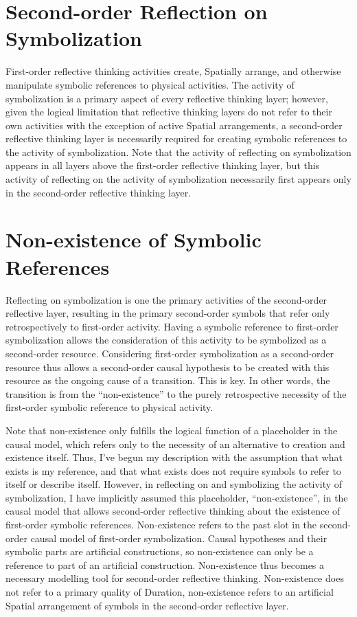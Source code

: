 \section{Second-order Reflection on Symbolization}

First-order reflective thinking activities create, Spatially arrange,
and otherwise manipulate symbolic references to physical activities.
The activity of symbolization is a primary aspect of every reflective
thinking layer; however, given the logical limitation that reflective
thinking layers do not refer to their own activities with the
exception of active Spatial arrangements, a second-order reflective
thinking layer is necessarily required for creating symbolic
references to the activity of symbolization.  Note that the activity
of reflecting on symbolization appears in all layers above the
first-order reflective thinking layer, but this activity of reflecting
on the activity of symbolization necessarily first appears only in the
second-order reflective thinking layer.

\section{Non-existence of Symbolic References}

Reflecting on symbolization is one the primary activities of the
second-order reflective layer, resulting in the primary second-order
symbols that refer only retrospectively to first-order activity.
Having a symbolic reference to first-order symbolization allows the
consideration of this activity to be symbolized as a second-order
resource.  Considering first-order symbolization as a second-order
resource thus allows a second-order causal hypothesis to be created
with this resource as the ongoing cause of a transition.  This is key.
In other words, the transition is from the ``non-existence'' to the
purely retrospective necessity of the first-order symbolic reference
to physical activity.

Note that non-existence only fulfills the logical function of a
placeholder in the causal model, which refers only to the necessity of
an alternative to creation and existence itself.  Thus, I've begun my
description with the assumption that what exists is my reference, and
that what exists does not require symbols to refer to itself or
describe itself.  However, in reflecting on and symbolizing the
activity of symbolization, I have implicitly assumed this placeholder,
``non-existence'', in the causal model that allows second-order
reflective thinking about the existence of first-order symbolic
references.  Non-existence refers to the past slot in the second-order
causal model of first-order symbolization.  Causal hypotheses and
their symbolic parts are artificial constructions, so non-existence
can only be a reference to part of an artificial construction.
Non-existence thus becomes a necessary modelling tool for second-order
reflective thinking.  Non-existence does not refer to a primary
quality of Duration, non-existence refers to an artificial Spatial
arrangement of symbols in the second-order reflective layer.

